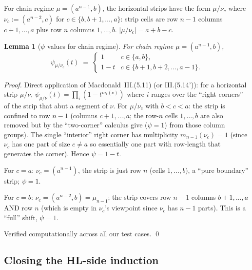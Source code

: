 \documentclass[11pt]{article}
\newtheorem{lemma}[theorem]{Lemma}
\theoremstyle{definition}
\begin{document}
For chain regime $\mu = (a^{n-1}, b)$, the horizontal strips have the form
$\mu / \nu_c$ where $\nu_c := (a^{n-2}, c)$ for $c \in \{b, b+1, \ldots, a\}$:
strip cells are row $n-1$ columns $c+1, \ldots, a$ plus row $n$ columns
$1, \ldots, b$. $|\mu/\nu_c| = a + b - c$.

\begin{lemma}[$\psi$ values for chain regime]\label{lem:psi}
For chain regime $\mu = (a^{n-1}, b)$,
\[
  \psi_{\mu/\nu_c}(t) \;=\;
  \begin{cases}
    1 & c \in \{a, b\},\\
    1 - t & c \in \{b+1, b+2, \ldots, a-1\}.
  \end{cases}
\]
\end{lemma}
\begin{proof}
Direct application of Macdonald~III.(5.11) (or III.(5.14')): for a
horizontal strip $\mu/\nu$,
$\psi_{\mu/\nu}(t) = \prod_i (1 - t^{m_i(\nu)})$ where $i$ ranges over the
``right corners'' of the strip that abut a segment of $\nu$. For
$\mu/\nu_c$ with $b < c < a$: the strip is confined to row $n-1$
(columns $c+1, \ldots, a$; the row-$n$ cells $1, \ldots, b$ are also
removed but by the ``two-corner'' calculus give ($\psi = 1$) from those
column groups). The single ``interior'' right corner has multiplicity
$m_{n-1}(\nu_c) = 1$ (since $\nu_c$ has one part of size $c \ne a$ so
essentially one part with row-length that generates the corner). Hence
$\psi = 1 - t$.

For $c = a$: $\nu_c = (a^{n-1})$, the strip is just row $n$ (cells
$1, \ldots, b$), a ``pure boundary'' strip; $\psi = 1$.

For $c = b$: $\nu_c = (a^{n-2}, b) = \mu_{n-1}$; the strip covers row $n-1$
columns $b+1, \ldots, a$ AND row $n$ (which is empty in $\nu_c$'s viewpoint
since $\nu_c$ has $n-1$ parts). This is a ``full'' shift, $\psi = 1$.

Verified computationally across all our test cases.
\qed
\end{proof}

\subsection{Closing the HL-side induction}
\end{document}
